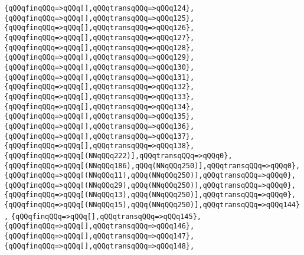 \verb|{qQQqfinqQQq=>qQQq[],qQQqtransqQQq=>qQQq124},|\newline
\verb|{qQQqfinqQQq=>qQQq[],qQQqtransqQQq=>qQQq125},|\newline
\verb|{qQQqfinqQQq=>qQQq[],qQQqtransqQQq=>qQQq126},|\newline
\verb|{qQQqfinqQQq=>qQQq[],qQQqtransqQQq=>qQQq127},|\newline
\verb|{qQQqfinqQQq=>qQQq[],qQQqtransqQQq=>qQQq128},|\newline
\verb|{qQQqfinqQQq=>qQQq[],qQQqtransqQQq=>qQQq129},|\newline
\verb|{qQQqfinqQQq=>qQQq[],qQQqtransqQQq=>qQQq130},|\newline
\verb|{qQQqfinqQQq=>qQQq[],qQQqtransqQQq=>qQQq131},|\newline
\verb|{qQQqfinqQQq=>qQQq[],qQQqtransqQQq=>qQQq132},|\newline
\verb|{qQQqfinqQQq=>qQQq[],qQQqtransqQQq=>qQQq133},|\newline
\verb|{qQQqfinqQQq=>qQQq[],qQQqtransqQQq=>qQQq134},|\newline
\verb|{qQQqfinqQQq=>qQQq[],qQQqtransqQQq=>qQQq135},|\newline
\verb|{qQQqfinqQQq=>qQQq[],qQQqtransqQQq=>qQQq136},|\newline
\verb|{qQQqfinqQQq=>qQQq[],qQQqtransqQQq=>qQQq137},|\newline
\verb|{qQQqfinqQQq=>qQQq[],qQQqtransqQQq=>qQQq138},|\newline
\verb|{qQQqfinqQQq=>qQQq[(NNqQQq222)],qQQqtransqQQq=>qQQq0},|\newline
\verb|{qQQqfinqQQq=>qQQq[(NNqQQq186),qQQq(NNqQQq250)],qQQqtransqQQq=>qQQq0},|\newline
\verb|{qQQqfinqQQq=>qQQq[(NNqQQq11),qQQq(NNqQQq250)],qQQqtransqQQq=>qQQq0},|\newline
\verb|{qQQqfinqQQq=>qQQq[(NNqQQq29),qQQq(NNqQQq250)],qQQqtransqQQq=>qQQq0},|\newline
\verb|{qQQqfinqQQq=>qQQq[(NNqQQq13),qQQq(NNqQQq250)],qQQqtransqQQq=>qQQq0},|\newline
\verb|{qQQqfinqQQq=>qQQq[(NNqQQq15),qQQq(NNqQQq250)],qQQqtransqQQq=>qQQq144},|\newline
\verb|{qQQqfinqQQq=>qQQq[],qQQqtransqQQq=>qQQq145},|\newline
\verb|{qQQqfinqQQq=>qQQq[],qQQqtransqQQq=>qQQq146},|\newline
\verb|{qQQqfinqQQq=>qQQq[],qQQqtransqQQq=>qQQq147},|\newline
\verb|{qQQqfinqQQq=>qQQq[],qQQqtransqQQq=>qQQq148},|\newline
